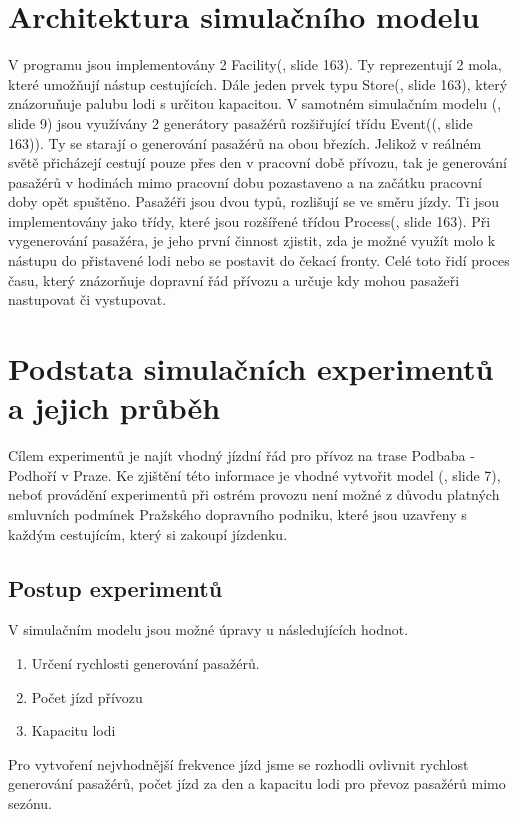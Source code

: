 \documentclass[11pt,a4paper]{article}
\begin{document}
	\section{Architektura simulačního modelu}
	V programu jsou implementovány 2 Facility(\cite{SLAJD}, slide 163). Ty reprezentují 2 mola, které umožňují nástup cestujících.
    Dále jeden prvek typu Store(\cite{SLAJD}, slide 163), který znázoruňuje palubu lodi s určitou kapacitou. V samotném simulačním
	modelu (\cite{SLAJD}, slide 9) jsou využívány 2 generátory pasažérů rozšiřující třídu Event((\cite{SLAJD}, slide 163)). Ty se starají o generování
	pasažérů na obou březích. Jelikož v reálném světě přicházejí cestují pouze přes den v pracovní době přívozu,
	tak je generování pasažérů v hodinách mimo pracovní dobu pozastaveno a na začátku pracovní doby opět spuštěno.
	Pasažéři jsou dvou typů, rozlišují se ve směru jízdy. Ti jsou implementovány jako třídy, které jsou rozšířené
	třídou Process(\cite{SLAJD}, slide 163). Při vygenerování pasažéra, je jeho první činnost zjistit, zda je možné využít molo k nástupu
	do přistavené lodi nebo se postavit do čekací fronty. Celé toto řidí proces času, který znázorňuje
	dopravní řád přívozu a určuje kdy mohou pasažeři nastupovat či vystupovat.

	\section{Podstata simulačních experimentů a jejich průběh}

	Cílem experimentů je najít vhodný jízdní řád pro přívoz na trase Podbaba - Podhoří v Praze.
	Ke zjištění této informace je vhodné vytvořit model (\cite{SLAJD}, slide 7),
	neboť provádění experimentů při ostrém provozu není možné z důvodu platných smluvních
	podmínek Pražského dopravního podniku, které jsou uzavřeny s každým cestujícím, který
	si zakoupí jízdenku.
	\subsection{Postup experimentů}
  V simulačním modelu jsou možné úpravy u následujících hodnot.
	\begin{enumerate}
		\item Určení rychlosti generování pasažérů.
		\item Počet jízd přívozu
		\item Kapacitu lodi
	\end{enumerate}

	Pro vytvoření nejvhodnější frekvence jízd jsme se rozhodli ovlivnit rychlost
	generování pasažérů, počet jízd za den a kapacitu lodi pro převoz pasažérů mimo
	sezónu.
\end{document}
